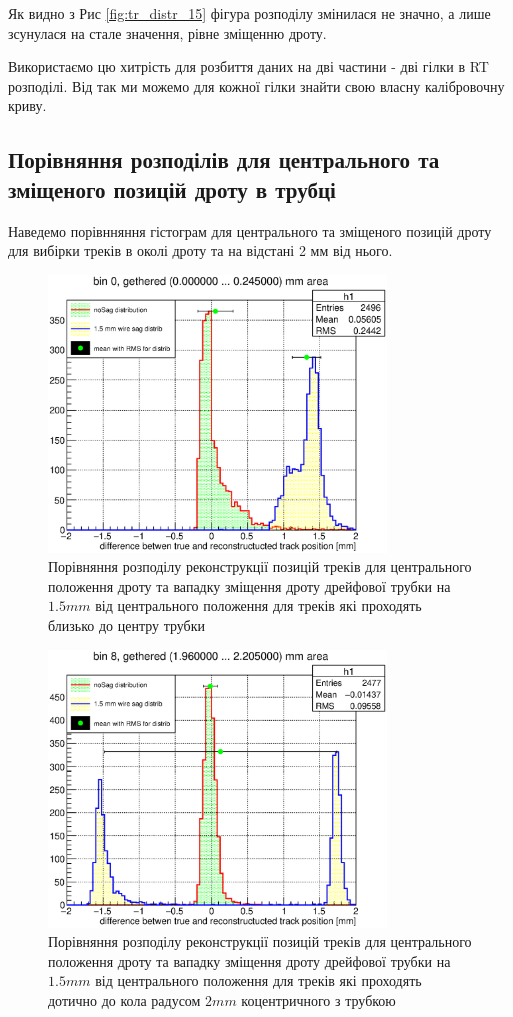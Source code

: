 \documentclass[]{article}
\begin{document}
	Як видно з Рис \ref{fig:tr_distr_15} фігура розподілу змінилася не значно, а лише зсунулася на стале значення, рівне зміщенню дроту.
	
	Використаємо цю хитрість для розбиття даних на дві частини - дві гілки в RT розподілі. Від так ми можемо для  кожної гілки знайти свою власну калібровочну криву.
	
	\subsection{ Порівняння розподілів для центрального та зміщеного позицій дроту в трубці}	
	Наведемо порівнняння гістограм для центрального та зміщеного позицій дроту для вибірки треків в околі дроту та на відстані 2 мм від нього.
	
	\begin{figure}[h!]
	\includegraphics[width=0.8\textwidth]{bin0_0mm.eps}
	\centering
	\caption{ Порівняння розподілу реконструкції позицій треків для центрального положення дроту та вападку зміщення дроту дрейфової трубки на $1.5 mm$ від центрального положення для треків які проходять близько до центру трубки}
	\end{figure}
	
	\begin{figure}[h!]
	\includegraphics[width=0.8\textwidth]{bin8_2mm.eps}
	\centering
	\caption{ Порівняння розподілу реконструкції позицій треків для центрального положення дроту та вападку зміщення дроту дрейфової трубки на $1.5 mm$ від центрального положення для треків які проходять дотично до кола радусом $2mm$  коцентричного з трубкою}
	\end{figure}
	
\end{document}
